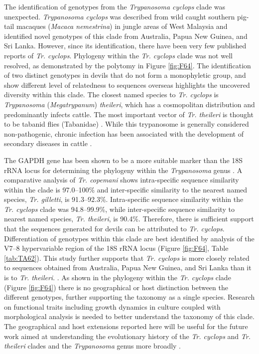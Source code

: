 \documentclass[a4paper, nobind]{templates/ociamthesis}
\begin{document}
The identification of genotypes from the \emph{Trypanosoma cyclops} clade was unexpected. \emph{Trypanosoma cyclops} was described from wild caught southern pig-tail macaques (\emph{Macaca nemestrina}) in jungle areas of West Malaysia \autocite{weinmanTrypanosomaCyclopsSp1972} and \textcite{hamiltonNewLineageTrypanosomes2005} identified novel genotypes of this clade from Australia, Papua New Guinea, and Sri Lanka. However, since its identification, there have been very few published reports of \emph{Tr. cyclops}. Phylogeny within the \emph{Tr. cyclops} clade was not well resolved, as demonstrated by the polytomy in Figure \ref{fig:F64}. The identification of two distinct genotypes in devils that do not form a monophyletic group, and show different level of relatedness to sequences overseas highlights the uncovered diversity within this clade. The closest named species to \emph{Tr. cyclops} is \emph{Trypanosoma} (\emph{Megatrypanum}) \emph{theileri}, which has a cosmopolitan distribution and predominantly infects cattle. The most important vector of \emph{Tr. theileri} is thought to be tabanid flies (Tabanidae) \autocite{hoareTrypanosomesMammalsZoological1972,werszkoMolecularDetectionMegatrypanum2020}. While this trypanosome is generally considered non-pathogenic, chronic infection has been associated with the development of secondary diseases in cattle \autocite{rodriguesCharacterizationSplicedLeader2010}.

The GAPDH gene has been shown to be a more suitable marker than the 18S rRNA locus for determining the phylogeny within the \emph{Trypanosoma} genus \autocite{hamiltonTrypanosomesAreMonophyletic2004}. A comparative analysis of \emph{Tr. copemani} shows intra-specific sequence similarity within the clade is 97.0--100\% and inter-specific similarity to the nearest named species, \emph{Tr. gilletti}, is 91.3--92.3\%. Intra-specific sequence similarity within the \emph{Tr. cyclops} clade was 94.8--99.9\%, while inter-specific sequence similarity to nearest named species, \emph{Tr. theileri}, is 90.4\%. Therefore, there is sufficient support that the sequences generated for devils can be attributed to \emph{Tr. cyclops}. Differentiation of genotypes within this clade are best identified by analysis of the V7--8 hypervariable region of the 18S rRNA locus (Figure \ref{fig:F64}, Table \ref{tab:TA62}). This study further supports that \emph{Tr. cyclops} is more closely related to sequences obtained from Australia, Papua New Guinea, and Sri Lanka than it is to \emph{Tr. theileri}. \autocite{hamiltonNewLineageTrypanosomes2005}. As shown in the phylogeny within the \emph{Tr. cyclops} clade (Figure \ref{fig:F64}) there is no geographical or host distinction between the different genotypes, further supporting the taxonomy as a single species. Research on functional traits including growth dynamics in culture coupled with morphological analysis is needed to better understand the taxonomy of this clade. The geographical and host extensions reported here will be useful for the future work aimed at understanding the evolutionary history of the \emph{Tr. cyclops} and \emph{Tr. theileri} clades and the \emph{Trypanosoma} genus more broadly \autocite{hamiltonEvolutionTrypanosomaCruzi2012}.
\end{document}
